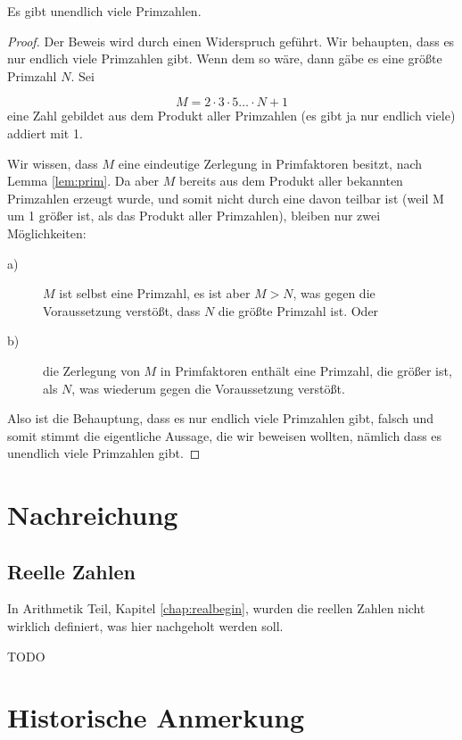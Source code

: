 \begin{theorem}
Es gibt unendlich viele Primzahlen.
\end{theorem}
\begin{proof}
Der Beweis wird durch einen Widerspruch geführt. Wir behaupten, dass es nur endlich viele Primzahlen gibt. Wenn dem so wäre, dann gäbe es eine größte Primzahl $N$. Sei

\[ M = 2\cdot 3\cdot 5\dots \cdot N +1 \]
eine Zahl gebildet aus dem Produkt aller Primzahlen (es gibt ja nur endlich viele) addiert mit 1.

Wir wissen, dass $M$ eine eindeutige Zerlegung in Primfaktoren besitzt, nach Lemma \ref{lem:prim}. Da aber $M$ bereits aus dem Produkt aller bekannten Primzahlen erzeugt wurde, und somit nicht durch eine davon teilbar ist (weil M um 1 größer ist, als das Produkt aller Primzahlen), bleiben nur zwei Möglichkeiten: 

\begin{description}
\item[a)] $M$ ist selbst eine Primzahl, es ist aber $M>N$, was gegen die Voraussetzung verstößt, dass $N$ die größte Primzahl ist. Oder
\item[b)] die Zerlegung von $M$ in Primfaktoren enthält eine Primzahl, die größer ist, als $N$, was wiederum gegen die Voraussetzung verstößt.
\end{description}

Also ist die Behauptung, dass es nur endlich viele Primzahlen gibt, falsch und somit stimmt die eigentliche Aussage, die wir beweisen wollten, nämlich dass es unendlich viele Primzahlen gibt. 
\end{proof}

\section{Nachreichung}

\subsection{Reelle Zahlen}\label{chap:realfinal}

In Arithmetik Teil, Kapitel \ref{chap:realbegin}, wurden die reellen Zahlen nicht wirklich definiert, was hier nachgeholt werden soll. 

TODO



\section{Historische Anmerkung}

